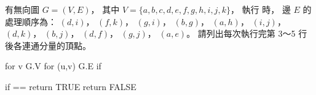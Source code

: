 \startEXERCISE
有無向圖 $G=(V,E)$，
其中 $V=\{a,b,c,d,e,f,g,h,i,j,k\}$，
執行  時，
邊 $E$ 的處理順序為：
 $(d,i)$， $(f,k)$， $(g,i)$， $(b,g)$， $(a,h)$， $(i,j)$， $(d,k)$， $(b,j)$， $(d,f)$， $(g,j)$， $(a,e)$。
請列出每次執行完第 3～5 行後各連通分量的頂點。

\startCLRSCODE
for v \in G.V
for (u,v) \in G.E
	if  \ne {}
\stopCLRSCODE

\startCLRSCODE
if  == 
	return TRUE
return FALSE
\stopCLRSCODE

\stopEXERCISE

\startANSWER
{}
\stopANSWER